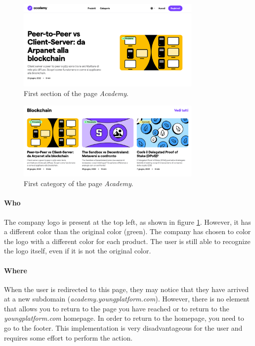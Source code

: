 \begin{figure}[H]
  \centering
  \includegraphics[width=0.80\textwidth]{res/images/internal-pages/academy/academy-1.png}
  \caption{First section of the page \textit{Academy}.}
  \label{fig:academy-1}
\end{figure}

\begin{figure}[H]
  \centering
  \includegraphics[width=0.80\textwidth]{res/images/internal-pages/academy/academy-2.png}
  \caption{First category of the page \textit{Academy}.}
  \label{fig:academy-2}
\end{figure}

\paragraph{Who}

The company logo is present at the top left, as shown in figure 
\ref{fig:academy-1}. However, it has a different color than the original 
color (green). The company has chosen to color the logo with a different 
color for each product. The user is still able to recognize the logo 
itself, even if it is not the original color. 

\paragraph{Where}

When the user is redirected to this page, they may notice that they have 
arrived at a new subdomain (\textit{academy.youngplatform.com}). However, 
there is no element that allows you to return to the page you have 
reached or to return to the \textit{youngplatform.com} homepage. In order 
to return to the homepage, you need to go to the footer. This 
implementation is very disadvantageous for the user and requires some 
effort to perform the action.

